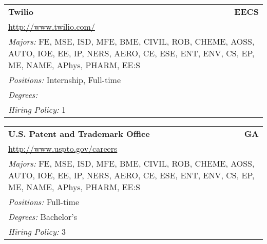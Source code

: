 \documentclass[twoside]{article}
\begin{document}
\begin{center}
\begin{multicols}{3}
\begin{FlushLeft}
\begin{minipage}{\columnwidth}\begin{tabularx}{.95\columnwidth}{Xr}
                 {\Large\bf Twilio} & {\Large\bf EECS}\\
    \multicolumn{2}{p{.95\columnwidth}}{\url{http://www.twilio.com/}}\\
    \multicolumn{2}{p{.95\columnwidth}}{\emph{Majors:} FE, MSE, ISD, MFE, BME, CIVIL, ROB, CHEME, AOSS, AUTO, IOE, EE, IP, NERS, AERO, CE, ESE, ENT, ENV, CS, EP, ME, NAME, APhys, PHARM, EE:S}\\
    \multicolumn{2}{p{.95\columnwidth}}{\emph{Positions:} Internship, Full-time}\\
    \multicolumn{2}{p{.95\columnwidth}}{\emph{Degrees:} }\\
    \multicolumn{2}{p{.95\columnwidth}}{\emph{Hiring Policy:} 1}\\
    \end{tabularx}
    
\end{minipage}
 
\begin{minipage}{\columnwidth}\begin{tabularx}{.95\columnwidth}{Xr}
                 {\Large\bf U.S. Patent and Trademark Office} & {\Large\bf GA}\\
    \multicolumn{2}{p{.95\columnwidth}}{\url{http://www.uspto.gov/careers}}\\
    \multicolumn{2}{p{.95\columnwidth}}{\emph{Majors:} FE, MSE, ISD, MFE, BME, CIVIL, ROB, CHEME, AOSS, AUTO, IOE, EE, IP, NERS, AERO, CE, ESE, ENT, ENV, CS, EP, ME, NAME, APhys, PHARM, EE:S}\\
    \multicolumn{2}{p{.95\columnwidth}}{\emph{Positions:} Full-time}\\
    \multicolumn{2}{p{.95\columnwidth}}{\emph{Degrees:} Bachelor's}\\
    \multicolumn{2}{p{.95\columnwidth}}{\emph{Hiring Policy:} 3}\\
    \end{tabularx}
    
\end{minipage}
 

\end{FlushLeft}
\end{multicols}
\end{center}
\end{document}
